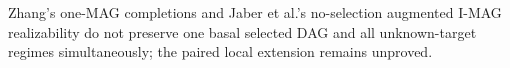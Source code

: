 Zhang's one-MAG completions and Jaber et al.'s no-selection augmented I-MAG realizability do not preserve one basal selected DAG and all unknown-target regimes simultaneously; the paired local extension remains unproved.